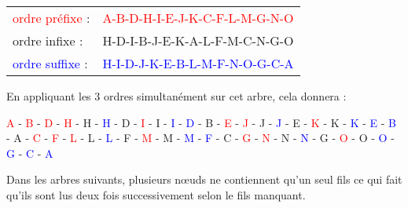 \documentclass[11pt,a4paper]{article}
\begin{document}
\medskip

\begin{tabular}{l l}
\textcolor{red}{ordre préfixe} : & \textcolor{red}{A-B-D-H-I-E-J-K-C-F-L-M-G-N-O} \\
\textcolor{green(htmlcssgreen)}{ordre infixe} :  & \textcolor{green(htmlcssgreen)}{H-D-I-B-J-E-K-A-L-F-M-C-N-G-O} \\
\textcolor{blue}{ordre suffixe} : & \textcolor{blue}{H-I-D-J-K-E-B-L-M-F-N-O-G-C-A} \\
\end{tabular}


\bigskip

En appliquant les 3 ordres simultanément sur cet arbre, cela donnera :

\begin{center}
\textcolor{red}{A} -
\textcolor{red}{B} -
\textcolor{red}{D} -
\textcolor{red}{H} -
\textcolor{green(htmlcssgreen)}{H} -
\textcolor{blue}{H} -
\textcolor{green(htmlcssgreen)}{D} -
\textcolor{red}{I} -
\textcolor{green(htmlcssgreen)}{I} -
\textcolor{blue}{I} -
\textcolor{blue}{D} -
\textcolor{green(htmlcssgreen)}{B} -
\textcolor{red}{E} -
\textcolor{red}{J} -
\textcolor{green(htmlcssgreen)}{J} -
\textcolor{blue}{J} -
\textcolor{green(htmlcssgreen)}{E} -
\textcolor{red}{K} -
\textcolor{green(htmlcssgreen)}{K} -
\textcolor{blue}{K} -
\textcolor{blue}{E} -
\textcolor{blue}{B} -
\textcolor{green(htmlcssgreen)}{A} - %
\textcolor{red}{C} -
\textcolor{red}{F} -
\textcolor{red}{L} -
\textcolor{green(htmlcssgreen)}{L} -
\textcolor{blue}{L} -
\textcolor{green(htmlcssgreen)}{F} -
\textcolor{red}{M} -
\textcolor{green(htmlcssgreen)}{M} -
\textcolor{blue}{M} -
\textcolor{blue}{F} -
\textcolor{green(htmlcssgreen)}{C} -
\textcolor{red}{G} -
\textcolor{red}{N} -
\textcolor{green(htmlcssgreen)}{N} -
\textcolor{blue}{N} -
\textcolor{green(htmlcssgreen)}{G} -
\textcolor{red}{O} -
\textcolor{green(htmlcssgreen)}{O} -
\textcolor{blue}{O} -
\textcolor{blue}{G} -
\textcolor{blue}{C} -
\textcolor{blue}{A}
\end{center}


\vspace*{1cm}

Dans les arbres suivants, plusieurs nœuds ne contiennent qu'un seul fils ce qui fait qu'ils sont lus deux fois successivement selon le fils manquant.

\end{document}

